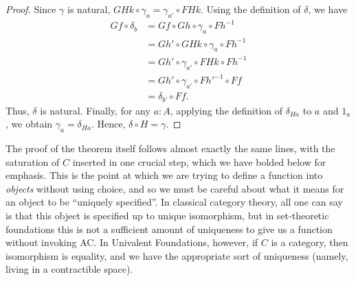 \documentclass{mscs}
\numberwithin{equation}{section}
\newcommand{\inv}[1]{{#1}^{-1}}
\begin{document}
\begin{proof}
  Since $\gamma$ is natural, $GHk\circ \gamma_a = \gamma_{a'} \circ FHk$.
  Using the definition of $\delta$, we have
  \begin{align*}
    Gf \circ \delta_b
    &= Gf \circ Gh \circ \gamma_a \circ \inv{Fh}\\
    &= Gh' \circ GHk\circ \gamma_a \circ \inv{Fh}\\
    &= Gh' \circ \gamma_{a'} \circ FHk \circ \inv{Fh}\\
    &= Gh' \circ \gamma_{a'} \circ \inv{Fh'} \circ Ff\\
    &= \delta_{b'} \circ Ff.
  \end{align*}
  Thus, $\delta$ is natural.
  Finally, for any $a:A$, applying the definition of $\delta_{Ha}$ to $a$ and $1_a$, we obtain $\gamma_a = \delta_{Ha}$.
  Hence, $\delta \circ H = \gamma$.
\end{proof}

The proof of the theorem itself follows almost exactly the same lines, with the saturation of $C$ inserted in one crucial step, which we have bolded below for emphasis.
This is the point at which we are trying to define a function into \emph{objects} without using choice, and so we must be careful about what it means for an object to be ``uniquely specified''.
In classical category theory, all one can say is that this object is specified up to unique isomorphism, but in set-theoretic foundations this is not a sufficient amount of uniqueness to give us a function without invoking AC.
In Univalent Foundations, however, if $C$ is a category, then isomorphism is equality, and we have the appropriate sort of uniqueness (namely, living in a contractible space).
\end{document}
